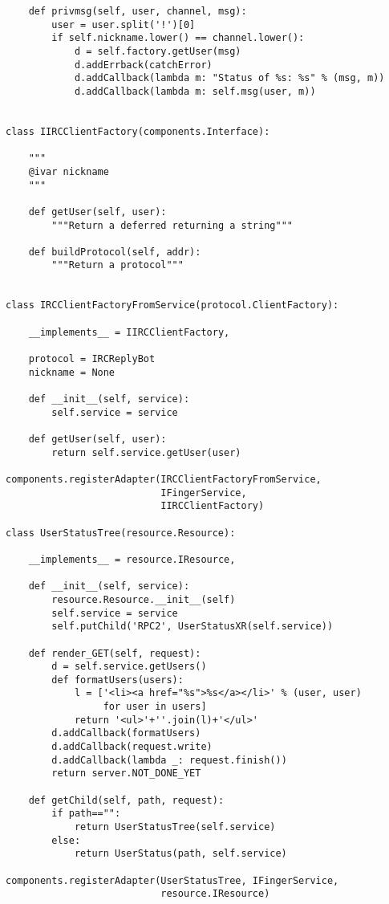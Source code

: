 \begin{verbatim}
    def privmsg(self, user, channel, msg):
        user = user.split('!')[0]
        if self.nickname.lower() == channel.lower():
            d = self.factory.getUser(msg)
            d.addErrback(catchError)
            d.addCallback(lambda m: "Status of %s: %s" % (msg, m))
            d.addCallback(lambda m: self.msg(user, m))


class IIRCClientFactory(components.Interface):

    """
    @ivar nickname
    """

    def getUser(self, user):
        """Return a deferred returning a string"""

    def buildProtocol(self, addr):
        """Return a protocol"""


class IRCClientFactoryFromService(protocol.ClientFactory):

    __implements__ = IIRCClientFactory,

    protocol = IRCReplyBot
    nickname = None

    def __init__(self, service):
        self.service = service

    def getUser(self, user):
        return self.service.getUser(user)

components.registerAdapter(IRCClientFactoryFromService,
                           IFingerService,
                           IIRCClientFactory)

class UserStatusTree(resource.Resource):

    __implements__ = resource.IResource,

    def __init__(self, service):
        resource.Resource.__init__(self)
        self.service = service
        self.putChild('RPC2', UserStatusXR(self.service))

    def render_GET(self, request):
        d = self.service.getUsers()
        def formatUsers(users):
            l = ['<li><a href="%s">%s</a></li>' % (user, user)
                 for user in users]
            return '<ul>'+''.join(l)+'</ul>'
        d.addCallback(formatUsers)
        d.addCallback(request.write)
        d.addCallback(lambda _: request.finish())
        return server.NOT_DONE_YET

    def getChild(self, path, request):
        if path=="":
            return UserStatusTree(self.service)
        else:
            return UserStatus(path, self.service)

components.registerAdapter(UserStatusTree, IFingerService,
                           resource.IResource)


\end{verbatim}
